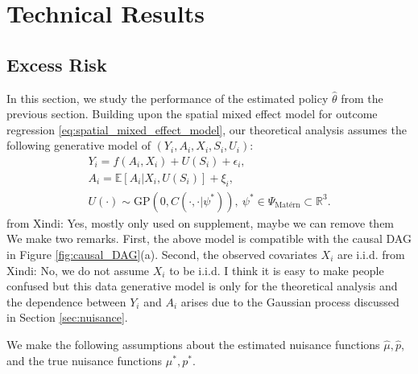 \documentclass[12pt]{article}
\newcommand{\E}{\mathbb{E}}
\newcommand{\R}{\mathbb{R}}
\newcommand{\CP}[1]{{\color{purple}From Chan: #1}}
\newcommand{\XL}[1]{{\color{blue}from Xindi: #1}}
\begin{document}
 





\section{Technical Results}\label{sec:theory}

\subsection{Excess Risk}
In this section, we study the performance of the estimated policy $\widehat\theta$ from the previous section. Building upon the spatial mixed effect model for outcome regression \eqref{eq:spatial_mixed_effect_model}, our theoretical analysis assumes the following generative model of $(Y_i, A_i, X_i, S_i, U_i)$:
\begin{gather}
    Y_i = f(A_i,X_i) + U(S_i) + \epsilon_i, \label{eq:data_generative_model_1}\\
    A_i = \E[A_i|X_i,U(S_i)]+\xi_i, \label{eq:data_generative_model_2} \\
  U(\cdot)\sim \mathrm{GP}(0,C(\cdot,\cdot|\psi^*)), \  \psi^*\in \Psi_{\text{Mat\'ern}}\subset \R^3.
\end{gather}
\XL{Yes, mostly only used on supplement, maybe we can remove them}
We make two remarks. First, the above model is compatible with the causal DAG in Figure \ref{fig:causal_DAG}(a). Second, the observed covariates $X_i$ are i.i.d. \XL{No, we do not assume $X_i$ to be i.i.d. I think it is easy to make people confused but this data generative model is only for the theoretical analysis} and the dependence between $Y_i$ and $A_i$ arises due to the Gaussian process discussed in Section \ref{sec:nuisance}. 

We make the following assumptions about the estimated nuisance functions $\widehat\mu,\widehat p$, and the true nuisance functions $\mu^*,p^*$. 
\end{document}

